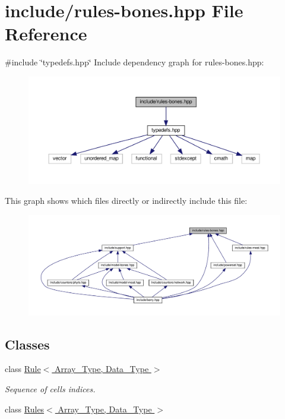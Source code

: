 \hypertarget{rules-bones_8hpp}{}\section{include/rules-\/bones.hpp File Reference}
\label{rules-bones_8hpp}
{\ttfamily \#include \char`\"{}typedefs.\+hpp\char`\"{}}\newline
Include dependency graph for rules-\/bones.hpp\+:
\nopagebreak
\begin{figure}[H]
\begin{center}
\leavevmode
\includegraphics[width=350pt]{rules-bones_8hpp__incl}
\end{center}
\end{figure}
This graph shows which files directly or indirectly include this file\+:
\nopagebreak
\begin{figure}[H]
\begin{center}
\leavevmode
\includegraphics[width=350pt]{rules-bones_8hpp__dep__incl}
\end{center}
\end{figure}
\subsection*{Classes}
\begin{DoxyCompactItemize}
\item 
class \hyperlink{class_rule}{Rule$<$ Array\+\_\+\+Type, Data\+\_\+\+Type $>$}
\begin{DoxyCompactList}\small\item\em Sequence of cells indices. \end{DoxyCompactList}\item 
class \hyperlink{class_rules}{Rules$<$ Array\+\_\+\+Type, Data\+\_\+\+Type $>$}
\end{DoxyCompactItemize}
